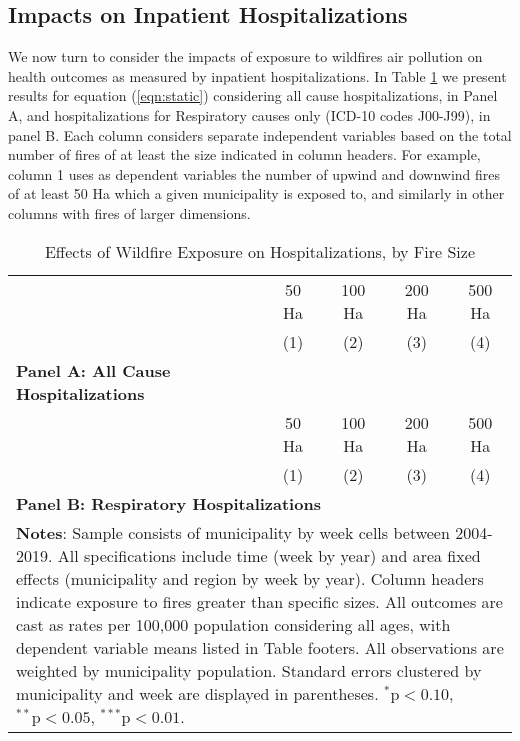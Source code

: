 \documentclass[11pt]{article}
\begin{document}
\begin{spacing}{1.5}
\subsection{Impacts on Inpatient Hospitalizations}
\label{scn:results_hosp}
We now turn to consider the impacts of exposure to wildfires air pollution on health outcomes as measured by inpatient hospitalizations.  In Table \ref{tab:RFhosp} we present results for equation (\ref{eqn:static}) considering all cause hospitalizations, in Panel A, and hospitalizations for Respiratory causes only (ICD-10 codes J00-J99), in panel B.  Each column considers separate independent variables based on the total number of fires of at least the size indicated in column headers.  For example, column 1 uses as dependent variables the number of upwind and downwind fires of at least 50 Ha which a given municipality is exposed to, and similarly in other columns with fires of larger dimensions.

\begin{table}[ht!]
    \caption{Effects of Wildfire Exposure on Hospitalizations, by Fire Size}
    \label{tab:RFhosp}
    \centering
    \begin{tabular}{lcccc} \\ \toprule
    & 50 Ha & 100 Ha & 200 Ha & 500 Ha \\ 
    & (1) & (2) & (3) & (4) \\ \midrule
    \multicolumn{1}{l}{\textbf{Panel A: All Cause Hospitalizations}}&&&&\\
     
    \midrule 
      & 50 Ha & 100 Ha & 200 Ha & 500 Ha \\ 
    & (1) & (2) & (3) & (4)\\ \midrule
    \multicolumn{5}{l}{\textbf{Panel B: Respiratory Hospitalizations}}\\
     
    \bottomrule
    \multicolumn{5}{p{12.8cm}}{{\footnotesize \textbf{Notes}: Sample consists of municipality by week cells between 2004-2019.  All specifications include time (week by year) and area fixed effects (municipality and region by week by year).  Column headers indicate exposure to fires greater than specific sizes.  All outcomes are cast as rates per 100,000 population considering all ages, with dependent variable means listed in Table footers.  All observations are weighted by municipality population.  Standard errors clustered by municipality and week are displayed in parentheses.   $^{*}\text{p}<0.10$, $^{**}\text{p}<0.05$, $^{***}\text{p}<0.01$.}}
    \end{tabular}
\end{table}


\end{spacing}
\end{document}

